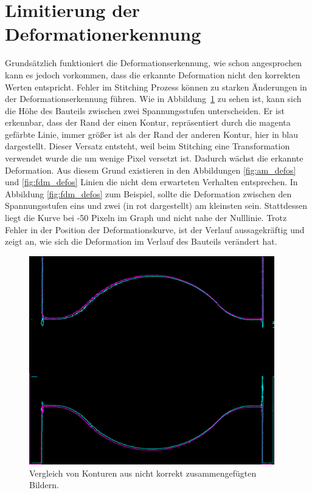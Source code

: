 \section{Limitierung der Deformationerkennung} \label{limits}

Grundsätzlich funktioniert die Deformationserkennung, wie schon angesprochen kann es 
jedoch vorkommen, dass die erkannte Deformation nicht den korrekten Werten entspricht.
Fehler im Stitching Prozess können zu starken Änderungen in der Deformationserkennung führen. 
Wie in Abbildung~\ref{fig:errors} zu sehen ist, kann sich die Höhe des Bauteils 
zwischen zwei Spannungsstufen unterscheiden. Er ist erkennbar, dass der Rand der einen 
Kontur, repräsentiert durch die magenta gefärbte Linie, immer größer ist als 
der Rand der anderen Kontur, hier in blau dargestellt.
Dieser Versatz entsteht, weil beim Stitching eine Transformation verwendet wurde die um 
wenige Pixel versetzt ist. Dadurch wächst die erkannte Deformation.
Aus diesem Grund existieren in den Abbildungen \ref{fig:am_defos} und \ref{fig:fdm_defos}
Linien die nicht dem erwarteten Verhalten entsprechen.
In Abbildung \ref{fig:fdm_defos} zum Beispiel, sollte die Deformation zwischen den 
Spannungsstufen eins und zwei 
(in rot dargestellt) am kleinsten sein. Stattdessen liegt die Kurve bei -50 Pixeln im Graph 
und nicht nahe der Nulllinie.
Trotz Fehler in der Position der Deformationskurve, ist der Verlauf aussagekräftig und zeigt an, 
wie sich die Deformation im Verlauf des Bauteils verändert hat.

\begin{figure}[H]
  \centering
  \includegraphics[width=0.95\textwidth]{images/contours_matching_36.png}
  \caption{Vergleich von Konturen aus nicht korrekt zusammengefügten Bildern.}
  \label{fig:errors}
\end{figure}

